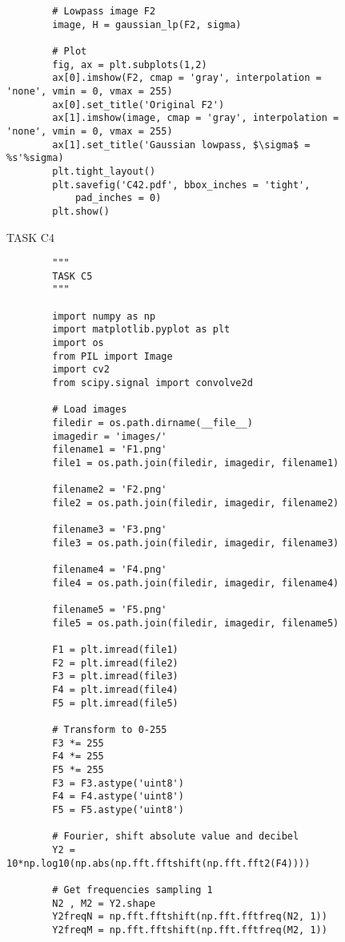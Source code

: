 {\begin{figure}[hbt!]
\begin{lstlisting}
        # Lowpass image F2
        image, H = gaussian_lp(F2, sigma)
        
        # Plot
        fig, ax = plt.subplots(1,2)
        ax[0].imshow(F2, cmap = 'gray', interpolation = 'none', vmin = 0, vmax = 255)
        ax[0].set_title('Original F2')
        ax[1].imshow(image, cmap = 'gray', interpolation = 'none', vmin = 0, vmax = 255)
        ax[1].set_title('Gaussian lowpass, $\sigma$ = %s'%sigma)
        plt.tight_layout()
        plt.savefig('C42.pdf', bbox_inches = 'tight',
            pad_inches = 0)
        plt.show()
    \end{lstlisting}
\caption{TASK C4}
\label{TASK C4}
\end{figure}

\begin{figure}[hbt!]
    \begin{lstlisting}
        """
        TASK C5
        """
        
        import numpy as np 
        import matplotlib.pyplot as plt
        import os
        from PIL import Image
        import cv2
        from scipy.signal import convolve2d
        
        # Load images
        filedir = os.path.dirname(__file__)
        imagedir = 'images/'
        filename1 = 'F1.png'
        file1 = os.path.join(filedir, imagedir, filename1)
        
        filename2 = 'F2.png'
        file2 = os.path.join(filedir, imagedir, filename2)
        
        filename3 = 'F3.png'
        file3 = os.path.join(filedir, imagedir, filename3)
        
        filename4 = 'F4.png'
        file4 = os.path.join(filedir, imagedir, filename4)
        
        filename5 = 'F5.png'
        file5 = os.path.join(filedir, imagedir, filename5)
        
        F1 = plt.imread(file1)
        F2 = plt.imread(file2)
        F3 = plt.imread(file3)
        F4 = plt.imread(file4)
        F5 = plt.imread(file5)
        
        # Transform to 0-255
        F3 *= 255
        F4 *= 255
        F5 *= 255
        F3 = F3.astype('uint8')
        F4 = F4.astype('uint8')
        F5 = F5.astype('uint8')
        
        # Fourier, shift absolute value and decibel 
        Y2 = 10*np.log10(np.abs(np.fft.fftshift(np.fft.fft2(F4))))
        
        # Get frequencies sampling 1
        N2 , M2 = Y2.shape
        Y2freqN = np.fft.fftshift(np.fft.fftfreq(N2, 1))
        Y2freqM = np.fft.fftshift(np.fft.fftfreq(M2, 1))
        

\end{lstlisting}
\end{figure}}

